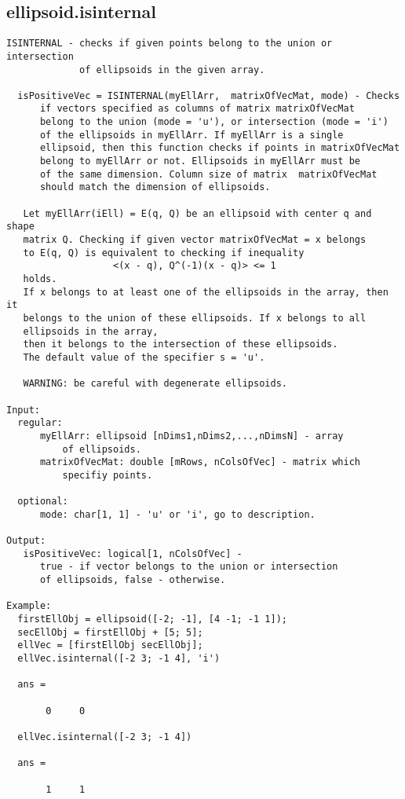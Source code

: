\subsection{\texorpdfstring{ellipsoid.isinternal}{isinternal}}\label{method:ellipsoid.isinternal}
\begin{verbatim}
ISINTERNAL - checks if given points belong to the union or intersection
             of ellipsoids in the given array.

  isPositiveVec = ISINTERNAL(myEllArr,  matrixOfVecMat, mode) - Checks
      if vectors specified as columns of matrix matrixOfVecMat
      belong to the union (mode = 'u'), or intersection (mode = 'i')
      of the ellipsoids in myEllArr. If myEllArr is a single
      ellipsoid, then this function checks if points in matrixOfVecMat
      belong to myEllArr or not. Ellipsoids in myEllArr must be
      of the same dimension. Column size of matrix  matrixOfVecMat
      should match the dimension of ellipsoids.

   Let myEllArr(iEll) = E(q, Q) be an ellipsoid with center q and shape
   matrix Q. Checking if given vector matrixOfVecMat = x belongs
   to E(q, Q) is equivalent to checking if inequality
                   <(x - q), Q^(-1)(x - q)> <= 1
   holds.
   If x belongs to at least one of the ellipsoids in the array, then it
   belongs to the union of these ellipsoids. If x belongs to all
   ellipsoids in the array,
   then it belongs to the intersection of these ellipsoids.
   The default value of the specifier s = 'u'.

   WARNING: be careful with degenerate ellipsoids.

Input:
  regular:
      myEllArr: ellipsoid [nDims1,nDims2,...,nDimsN] - array
          of ellipsoids.
      matrixOfVecMat: double [mRows, nColsOfVec] - matrix which
          specifiy points.

  optional:
      mode: char[1, 1] - 'u' or 'i', go to description.

Output:
   isPositiveVec: logical[1, nColsOfVec] -
      true - if vector belongs to the union or intersection
      of ellipsoids, false - otherwise.

Example:
  firstEllObj = ellipsoid([-2; -1], [4 -1; -1 1]);
  secEllObj = firstEllObj + [5; 5];
  ellVec = [firstEllObj secEllObj];
  ellVec.isinternal([-2 3; -1 4], 'i')

  ans =

       0     0

  ellVec.isinternal([-2 3; -1 4])

  ans =

       1     1
\end{verbatim}
